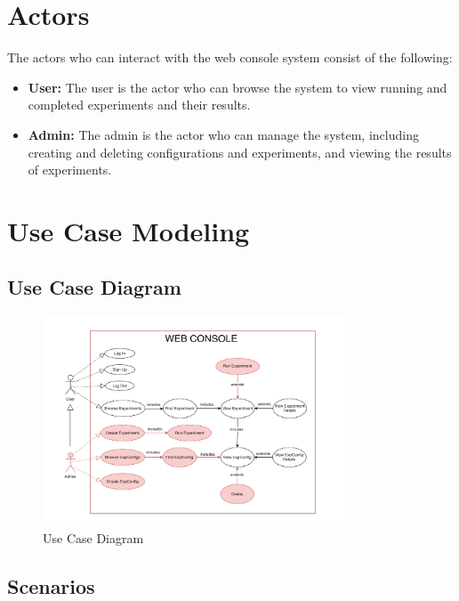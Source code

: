 \section{Actors}

The actors who can interact with the web console system consist of the following:
\begin{itemize}
    \item \textbf{User:} The user is the actor who can browse the system to view running and completed experiments and their results.
    \item \textbf{Admin:} The admin is the actor who can manage the system, including creating and deleting configurations and experiments, and viewing the results of experiments.
\end{itemize}

\section{Use Case Modeling}

\subsection{Use Case Diagram}

\begin{figure}[ht!]
    \centering
    \includegraphics[width=0.8\textwidth]{images/2_analisys/FL_class_diag.drawio.png}
    \caption{Use Case Diagram}
    \label{fig:use_case_diagram}
\end{figure}

\subsection{Scenarios}

